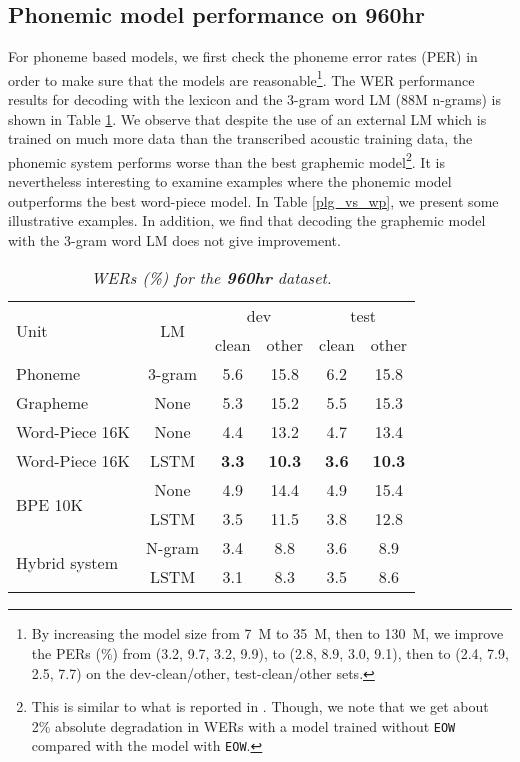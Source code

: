 \documentclass[a4paper]{article}
\begin{document}
\subsection{Phonemic model performance on 960hr}
		\vspace{-1mm}
For phoneme based models, we first check the phoneme error rates (PER) in order to make
sure that the models are reasonable\footnote{By increasing the model size from 7~M to 35~M, then to 130~M, we improve
the PERs (\%) from (3.2, 9.7, 3.2, 9.9), to (2.8, 8.9, 3.0, 9.1), then to  (2.4, 7.9, 2.5, 7.7) on the 
dev-clean/other, test-clean/other sets.}.
The WER performance results for decoding with the
lexicon and the 3-gram word LM (88M n-grams) is shown in Table \ref{960overview}.
We observe that despite the use of an external LM
which is trained on much more data than the transcribed acoustic training data, the phonemic system performs worse
than the best graphemic model\footnote{This is similar to what is reported in \cite{sainath2017no}. Though, we note that we get about 2\% absolute degradation in WERs
with a model trained without \texttt{EOW} compared with the model with \texttt{EOW}.}.
It is nevertheless interesting to examine examples where the phonemic model outperforms the best word-piece
model. In Table \ref{plg_vs_wp}, we present some illustrative examples.
In addition, we find that decoding the graphemic model with the 3-gram word LM does not give improvement.
\begin{table}[h]
	\centering
\setlength{\tabcolsep}{0.5em}
	\vspace{-2mm}
	\caption{\it WERs (\%) for the \textbf{960hr} dataset.}
	\vspace{-4mm}
	\label{960overview}
\begin{tabular}{ |l|c|c|c|c|c|} \hline
		\multirow{2}{*}{Unit} & \multirow{2}{*}{LM} & \multicolumn{2}{|c|}{dev} & \multicolumn{2}{|c|}{test}    \\ \cline{3-6}
		& & clean & other & clean & other    \\ \hline
		Phoneme      & 3-gram & 5.6 & 15.8 & 6.2 & 15.8  \\
		Grapheme     & None & 5.3 & 15.2 & 5.5 & 15.3  \\ 
		Word-Piece 16K & None & 4.4 & 13.2 & 4.7 & 13.4 \\ \hline
		Word-Piece 16K & LSTM & \textbf{3.3} & \textbf{10.3} & \textbf{3.6} & \textbf{10.3}  \\ \hline \hline
		\multirow{2}{*}{BPE 10K \cite{zeyer2018:asr-attention}} & None & 4.9 & 14.4 & 4.9 & 15.4 \\
		& LSTM & 3.5 & 11.5 & 3.8 & 12.8 \\ \hline
		\multirow{2}{*}{Hybrid system \cite{han2017capio}}  & N-gram & 3.4 & 8.8 & 3.6 & 8.9 \\
		& LSTM & 3.1 & 8.3 & 3.5 & 8.6 \\ \hline 
\end{tabular}
\vspace{-4mm}
\end{table}
\end{document}
